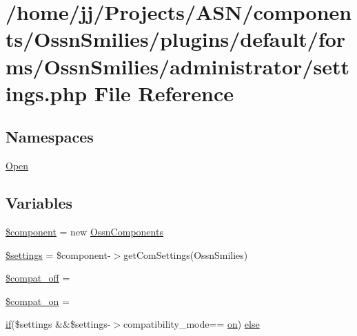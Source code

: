 \hypertarget{components_2_ossn_smilies_2plugins_2default_2forms_2_ossn_smilies_2administrator_2settings_8php}{}\section{/home/jj/\+Projects/\+A\+S\+N/components/\+Ossn\+Smilies/plugins/default/forms/\+Ossn\+Smilies/administrator/settings.php File Reference}
\label{components_2_ossn_smilies_2plugins_2default_2forms_2_ossn_smilies_2administrator_2settings_8php}
\subsection*{Namespaces}
\begin{DoxyCompactItemize}
\item 
 \hyperlink{namespace_open}{Open}
\end{DoxyCompactItemize}
\subsection*{Variables}
\begin{DoxyCompactItemize}
\item 
\hyperlink{components_2_ossn_smilies_2plugins_2default_2forms_2_ossn_smilies_2administrator_2settings_8php_a211527c21ba56109545060b49b628e59}{\$component} = new \hyperlink{class_ossn_components}{Ossn\+Components}
\item 
\hyperlink{components_2_ossn_smilies_2plugins_2default_2forms_2_ossn_smilies_2administrator_2settings_8php_ac7c3353107070daa85f641882931b358}{\$settings} = \$component-\/$>$get\+Com\+Settings(\textquotesingle{}Ossn\+Smilies\textquotesingle{})
\item 
\hyperlink{components_2_ossn_smilies_2plugins_2default_2forms_2_ossn_smilies_2administrator_2settings_8php_af80cff53181f0928899060dca05ab45d}{\$compat\+\_\+off} = \textquotesingle{}\textquotesingle{}
\item 
\hyperlink{components_2_ossn_smilies_2plugins_2default_2forms_2_ossn_smilies_2administrator_2settings_8php_a75b950b2159a5348d0d4fd5d9d14a273}{\$compat\+\_\+on} = \textquotesingle{}\textquotesingle{}
\item 
\hyperlink{jquery_8tokeninput_8js_ad8dd46a3cbc004569e34401e9e71771a}{if}(\$settings \&\&\$settings-\/$>$compatibility\+\_\+mode== \textquotesingle{}\hyperlink{fullpage_2plugin_8min_8js_a0258429d15d28b8440a6c44b3a15f390}{on}\textquotesingle{}) \hyperlink{components_2_ossn_smilies_2plugins_2default_2forms_2_ossn_smilies_2administrator_2settings_8php_a85f7820c0b7808985fe7e54628ee65f9}{else}
\end{DoxyCompactItemize}


